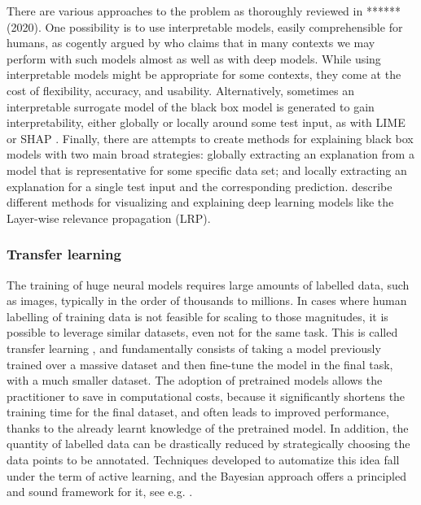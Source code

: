 There are various approaches to the problem as 
thoroughly reviewed in ****** (2020).
One possibility is to use interpretable models,
 easily comprehensible for humans,
as cogently argued by \cite{rudin2019stop} who claims 
that in many contexts we may perform with such models 
almost as well as with deep models.
 While using interpretable models might be appropriate for some
  contexts, they come at the cost of flexibility, accuracy, and usability.
  Alternatively, sometimes an interpretable surrogate model of the black box model is generated to gain interpretability, either globally or locally around
some test input, as with LIME \cite{ribeiro2016model} or SHAP \cite{lundberg2017unified}.
Finally, there are attempts to create methods for explaining 
black box models with two main broad strategies: globally
extracting an explanation from a model that is representative for some specific
data set; and locally extracting an explanation for a single test input 
 and the corresponding prediction.
  \cite{samek2017explainable} describe different methods for visualizing and explaining deep learning models like the Layer-wise relevance propagation (LRP). 
 
 
\subsubsection{Transfer learning}\label{sec:transfer}

The training of huge neural models requires large amounts of labelled data, such as images, typically in the order of thousands to millions. In cases where human labelling of training data is not feasible 
for scaling to those magnitudes, it is possible to leverage similar datasets, even not for the same task. This is called transfer learning \cite{tan2018survey,pan2009survey}, and fundamentally consists of taking a model previously trained over a massive dataset and then fine-tune the model in the final task, with a much smaller dataset. The adoption of pretrained models allows the practitioner to save in computational costs, because it significantly shortens the training time for the final dataset, and often leads to improved performance, thanks to the already learnt knowledge of the pretrained model. In addition, the quantity of labelled data can be drastically reduced by strategically choosing the data points to be annotated. Techniques developed to automatize this idea fall under the term of active learning, and the Bayesian approach offers a principled and sound framework for it, see e.g. \cite{houlsby2011bayesian}.

